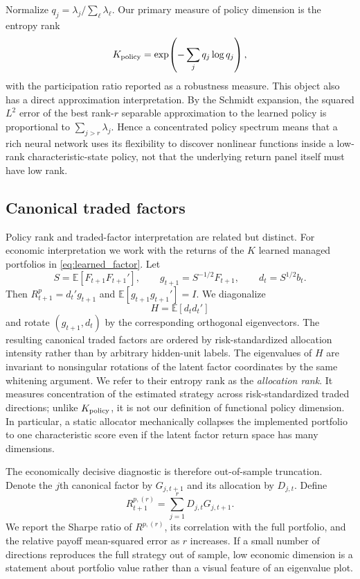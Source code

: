 Normalize $q_j=\lambda_j/\sum_{\ell}\lambda_\ell$.  Our primary measure of
policy dimension is the entropy rank
\begin{equation}
K_{\rm policy}=\exp\!\left(-\sum_jq_j\log q_j\right),
\label{eq:policy_rank}
\end{equation}
with the participation ratio reported as a robustness measure.
This object also has a direct approximation interpretation.  By the Schmidt
expansion, the squared $L^2$ error of the best rank-$r$ separable
approximation to the learned policy is proportional to
$\sum_{j>r}\lambda_j$.  Hence a concentrated policy spectrum means that a
rich neural network uses its flexibility to discover nonlinear functions
inside a low-rank characteristic-state policy, not that the underlying return
panel itself must have low rank.

\subsection{Canonical traded factors}
Policy rank and traded-factor interpretation are related but distinct.  For
economic interpretation we work with the returns of the $K$ learned managed
portfolios in \eqref{eq:learned_factor}.  Let
\begin{equation}
S=\mathbb E[F_{t+1}F_{t+1}'],\qquad
g_{t+1}=S^{-1/2}F_{t+1},\qquad d_t=S^{1/2}b_t.
\label{eq:risk_standardization}
\end{equation}
Then $R^p_{t+1}=d_t'g_{t+1}$ and $\mathbb E[g_{t+1}g_{t+1}']=I$.
We diagonalize
\begin{equation}
H=\mathbb E[d_td_t']
\label{eq:economic_operator}
\end{equation}
and rotate $(g_{t+1},d_t)$ by the corresponding orthogonal eigenvectors.
The resulting canonical traded factors are ordered by risk-standardized
allocation intensity rather than by arbitrary hidden-unit labels.
The eigenvalues of $H$ are invariant to nonsingular rotations of the latent
factor coordinates by the same whitening argument.  We refer to their
entropy rank as the \emph{allocation rank}.  It measures concentration of the
estimated strategy across risk-standardized traded directions; unlike
$K_{\rm policy}$, it is not our definition of functional policy dimension.
In particular, a static allocator mechanically collapses the implemented
portfolio to one characteristic score even if the latent factor return space
has many dimensions.

The economically decisive diagnostic is therefore out-of-sample truncation.
Denote the $j$th canonical factor by $G_{j,t+1}$ and its allocation by
$D_{j,t}$. Define
\begin{equation}
R^{p,(r)}_{t+1}=\sum_{j=1}^{r}D_{j,t}G_{j,t+1}.
\label{eq:truncated_portfolio}
\end{equation}
We report the Sharpe ratio of $R^{p,(r)}$, its correlation with the full
portfolio, and the relative payoff mean-squared error as $r$ increases.  If a
small number of directions reproduces the full strategy out of sample, low
economic dimension is a statement about portfolio value rather than a visual
feature of an eigenvalue plot.
